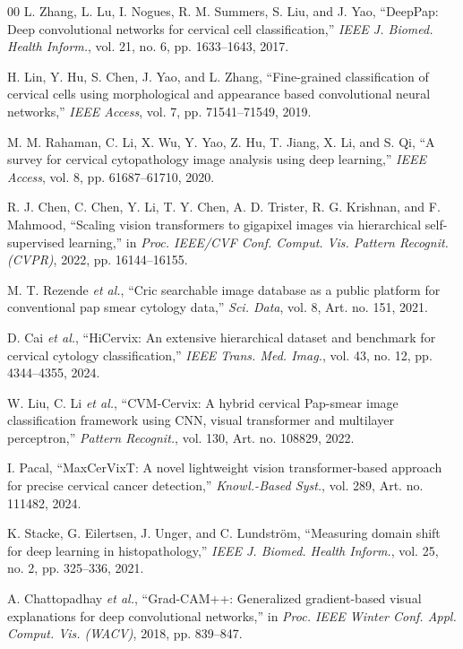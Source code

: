 \documentclass[conference]{IEEEtran}
\begin{document}
\begin{thebibliography}{00}
L. Zhang, L. Lu, I. Nogues, R. M. Summers, S. Liu, and J. Yao, ``DeepPap: Deep convolutional networks for cervical cell classification,'' \textit{IEEE J. Biomed. Health Inform.}, vol. 21, no. 6, pp. 1633--1643, 2017.

H. Lin, Y. Hu, S. Chen, J. Yao, and L. Zhang, ``Fine-grained classification of cervical cells using morphological and appearance based convolutional neural networks,'' \textit{IEEE Access}, vol. 7, pp. 71541--71549, 2019.

M. M. Rahaman, C. Li, X. Wu, Y. Yao, Z. Hu, T. Jiang, X. Li, and S. Qi, ``A survey for cervical cytopathology image analysis using deep learning,'' \textit{IEEE Access}, vol. 8, pp. 61687--61710, 2020.

R. J. Chen, C. Chen, Y. Li, T. Y. Chen, A. D. Trister, R. G. Krishnan, and F. Mahmood, ``Scaling vision transformers to gigapixel images via hierarchical self-supervised learning,'' in \textit{Proc. IEEE/CVF Conf. Comput. Vis. Pattern Recognit. (CVPR)}, 2022, pp. 16144--16155.

M. T. Rezende \textit{et al.}, ``Cric searchable image database as a public platform for conventional pap smear cytology data,'' \textit{Sci. Data}, vol. 8, Art. no. 151, 2021.

D. Cai \textit{et al.}, ``HiCervix: An extensive hierarchical dataset and benchmark for cervical cytology classification,'' \textit{IEEE Trans. Med. Imag.}, vol. 43, no. 12, pp. 4344--4355, 2024.

W. Liu, C. Li \textit{et al.}, ``CVM-Cervix: A hybrid cervical Pap-smear image classification framework using CNN, visual transformer and multilayer perceptron,'' \textit{Pattern Recognit.}, vol. 130, Art. no. 108829, 2022.

I. Pacal, ``MaxCerVixT: A novel lightweight vision transformer-based approach for precise cervical cancer detection,'' \textit{Knowl.-Based Syst.}, vol. 289, Art. no. 111482, 2024.

K. Stacke, G. Eilertsen, J. Unger, and C. Lundstr\"om, ``Measuring domain shift for deep learning in histopathology,'' \textit{IEEE J. Biomed. Health Inform.}, vol. 25, no. 2, pp. 325--336, 2021.

A. Chattopadhay \textit{et al.}, ``Grad-CAM++: Generalized gradient-based visual explanations for deep convolutional networks,'' in \textit{Proc. IEEE Winter Conf. Appl. Comput. Vis. (WACV)}, 2018, pp. 839--847.


\end{thebibliography}
\end{document}
